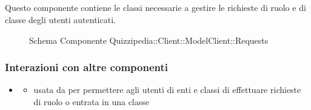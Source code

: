 \subsection{}
Questo componente contiene le classi necessarie a gestire le richieste di ruolo e di classe degli utenti autenticati.
\begin{figure}[H]
\centering
\noindent{}
\caption[Schema Componente Quizzipedia::Client::ModelClient::Requests]{Schema Componente Quizzipedia::Client::ModelClient::Requests}
\end{figure}
\subsubsection{Interazioni con altre componenti}
\begin{itemize}
\item {}
\begin{itemize}
\item usata da  per permettere agli utenti di enti e classi di effettuare richieste di ruolo o entrata in una classe
\end{itemize}
\end{itemize}
